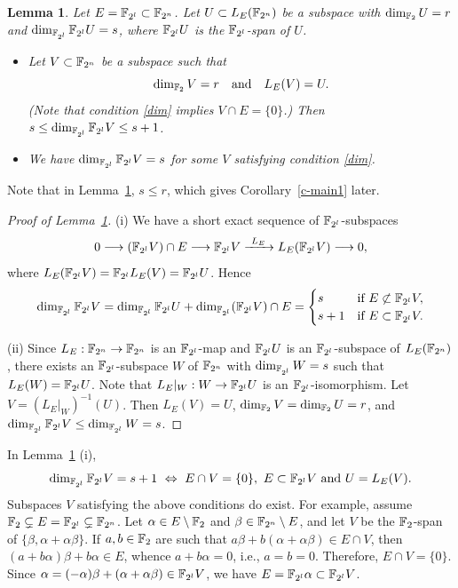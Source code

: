 \documentclass{amsart}
\newtheorem{lem}[thm]{Lemma}
\numberwithin{equation}{section}
\theoremstyle{definition}
\newcommand{\f}{\Bbb F}
\begin{document}
\begin{lem}\label{lemUV}
Let $E=\f_{2^l}\subset\f_{2^n}$. Let $U\subset L_E(\f_{2^n})$ be a subspace with $\dim_{\f_2}U=r$ and $\dim_{\f_{2^l}}\f_{2^l}U=s$, where $\f_{2^l}U$ is the $\f_{2^l}$-span of $U$. 
\begin{itemize}
\item[(i)] 
Let $V\subset\f_{2^n}$ be a subspace such that
\begin{equation}\label{dim}
\dim_{\f_2}V=r\quad \text{and}\quad L_E(V)=U.
\end{equation}
(Note that condition \eqref{dim} implies $V\cap E=\{0\}$.) Then
$s\le \dim_{\f_{2^l}}\f_{2^l}V\le s+1$.

\item[(ii)]
We have $\dim_{\f_{2^l}}\f_{2^l}V=s$ for some $V$ satisfying condition \eqref{dim}.
\end{itemize}
\end{lem}

Note that in Lemma~\ref{lemUV}, $s\le r$, which gives Corollary~\ref{c-main1} later.

\begin{proof}[Proof of Lemma~\ref{lemUV}]
(i) We have a short exact sequence of $\f_{2^l}$-subspaces
\[
0\longrightarrow (\f_{2^l}V)\cap E\longrightarrow \f_{2^l}V\xrightarrow{\ L_E\ } L_E(\f_{2^l}V)\longrightarrow 0,
\]
where $L_E(\f_{2^l}V)=\f_{2^l}L_E(V)=\f_{2^l}U$. Hence
\begin{equation}\label{dim-formula}
\dim_{\f_{2^l}}\f_{2^l}V=\dim_{\f_{2^l}}\f_{2^l}U+\dim_{\f_{2^l}}(\f_{2^l}V)\cap E
=\begin{cases}
s&\text{if}\ E\not\subset \f_{2^l}V,\cr 
s+1&\text{if}\ E\subset \f_{2^l}V.
\end{cases}
\end{equation}

\medskip
(ii) Since $L_E:\f_{2^n}\to\f_{2^n}$ is an $\f_{2^l}$-map and $\f_{2^l}U$ is an $\f_{2^l}$-subspace of $L_E(\f_{2^n})$, there exists an $\f_{2^l}$-subspace $W$ of $\f_{2^n}$ with $\dim_{\f_{2^l}}W=s$ such that $L_E(W)=\f_{2^l}U$. Note that $L_E|_W:W\to \f_{2^l}U$ is an $\f_{2^l}$-isomorphism. Let $V=(L_E|_W)^{-1}(U)$. Then $L_E(V)=U$, $\dim_{\f_2}V=\dim_{\f_2}U=r$, and $\dim_{\f_{2^l}}\f_{2^l}V\le \dim_{\f_{2^l}}W=s$.
\end{proof}

\medskip
{}
In Lemma~\ref{lemUV} (i), 
\[
\dim_{\f_{2^l}}\f_{2^l}V=s+1\ \Leftrightarrow\ E\cap V=\{0\},\  E\subset\f_{2^l}V\ \text{and}\ U=L_E(V).
\]
Subspaces $V$ satisfying the above conditions do exist. For example, assume $\f_2\subsetneq E=\f_{2^l}\subsetneq \f_{2^n}$. Let $\alpha\in E\setminus\f_2$ and $\beta\in\f_{2^n}\setminus E$, and let $V$ be the $\f_2$-span of $\{\beta,\alpha+\alpha\beta\}$. If $a,b\in\f_2$ are such that $a\beta+b(\alpha+\alpha\beta)\in E\cap V$, then $(a+b\alpha)\beta+b\alpha\in E$, whence $a+b\alpha=0$, i.e., $a=b=0$. Therefore, $E\cap V=\{0\}$. Since $\alpha=(-\alpha)\beta+(\alpha+\alpha\beta)\in\f_{2^l}V$, we have $E=\f_{2^l}\alpha\subset \f_{2^l}V$.
\end{document}

